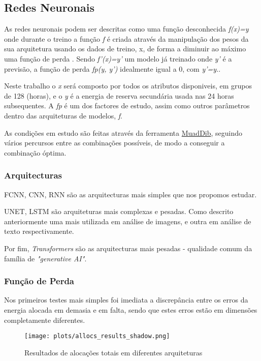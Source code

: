 \subsection{Redes Neuronais}

As redes neuronais podem ser descritas como uma função desconhecida \textit{f(x)=y} onde durante o treino a função \textit{f} é criada através da manipulação dos pesos da sua arquitetura usando os dados de treino, x, de forma a diminuir ao máximo uma função de perda . Sendo \textit{f'(x)=y'} um modelo já treinado onde \textit{y'} é a previsão, a função de perda \textit{fp(y, y')} idealmente igual a 0, com \textit{y'=y.}.\par
Neste trabalho o \textit{x} será composto por todos os atributos disponiveis, em grupos de 128 (horas), e o \textit{y} é a energia de reserva secundária usada nas 24 horas subsequentes. A \textit{fp} é um dos factores de estudo, assim como outros parâmetros dentro das arquiteturas de modelos, \textit{f}.\par
As condições em estudo são feitas através da ferramenta \hyperref[se:muaddib]{MuadDib}, seguindo vários percursos entre as combinações possíveis, de modo a conseguir a combinação óptima.\par

\subsubsection{Arquitecturas}

\gls{FCNN}, \gls{CNN}, RNN são as arquitecturas mais simples que nos propomos estudar.\par
UNET, \gls{LSTM} são arquiteturas mais complexas e pesadas. Como descrito anteriormente uma mais utilizada em análise de imagens, e outra em análise de texto respectivamente.\par 
Por fim, \textit{Transformers} são as arquitecturas mais pesadas - qualidade comum da família de \textit{"generative AI"}.

\subsubsection{Função de Perda}

Nos primeiros testes mais simples foi imediata a discrepância entre os erros da energia alocada em demasia e em falta, sendo que estes erros estão em dimensões completamente diferentes.
\begin{figure}[H]
    \centering
    \texttt{[image: plots/allocs\_results\_shadow.png]}
    \caption{Resultados de alocações totais em diferentes arquiteturas}
    \label{fig:resexparchs}
  \end{figure}

